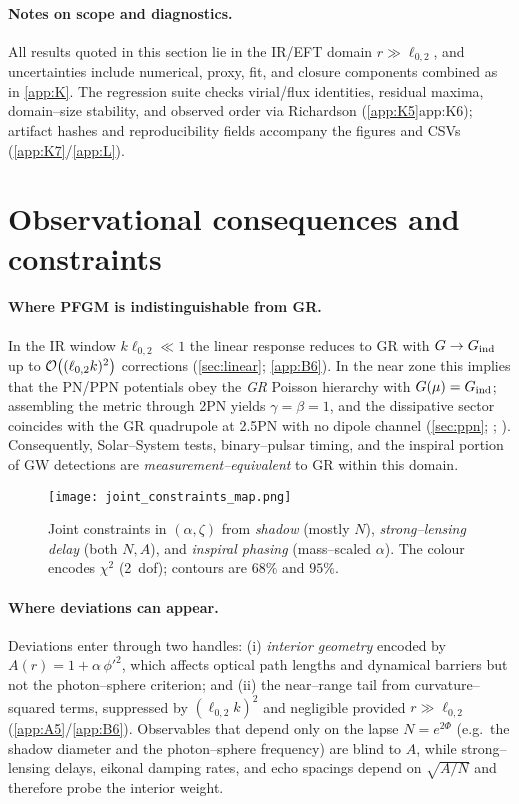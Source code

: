 \documentclass{iopjournal}
\begin{document}
\paragraph{Notes on scope and diagnostics.}
All results quoted in this section lie in the IR/EFT domain \(r\gg\ell_{0,2}\), and uncertainties include numerical, proxy, fit, and closure components combined as in \cref{app:K}. The regression suite checks virial/flux identities, residual maxima, domain–size stability, and observed order via Richardson (\cref{app:K5}{app:K6}); artifact hashes and reproducibility fields accompany the figures and CSVs (\cref{app:K7}/\cref{app:L}).

\section{Observational consequences and constraints}\label{sec:obs}
\paragraph{Where PFGM is indistinguishable from GR.}
In the IR window $k\ell_{0,2}\ll1$ the linear response reduces to GR with $G\to G_{\rm ind}$ up to $\order{(\ell_{0,2}k)^2}$ corrections (\cref{sec:linear}; \cref{app:B6}). In the near zone this implies that the PN/PPN potentials obey the \emph{GR} Poisson hierarchy with $G(\mu)=G_{\rm ind}$; assembling the metric through 2PN yields $\gamma=\beta=1$, and the dissipative sector coincides with the GR quadrupole at 2.5PN with no dipole channel (\cref{sec:ppn}; ; \cite{PoissonWill2014,Will2014LRR,Blanchet2014LRR}). Consequently, Solar–System tests, binary–pulsar timing, and the inspiral portion of GW detections are \emph{measurement–equivalent} to GR within this domain.

\begin{figure}[t]
\centering
\texttt{[image: joint\_constraints\_map.png]}
\caption{Joint constraints in \((\alpha,\zeta)\) from \textit{shadow} (mostly \(N\)), \textit{strong--lensing delay} (both \(N,A\)), and \textit{inspiral phasing} (mass--scaled \(\alpha\)). The colour encodes \(\chi^2\) (2~dof); contours are \(68\%\) and \(95\%\).}
\label{fig:joint-constraints}
\end{figure}


\paragraph{Where deviations can appear.}
Deviations enter through two handles: (i) \emph{interior geometry} encoded by $A(r)=1+\alpha\,\phi'^2$, which affects optical path lengths and dynamical barriers but not the photon–sphere criterion; and (ii) the near–range tail from curvature–squared terms, suppressed by $(\ell_{0,2}k)^2$ and negligible provided $r\gg \ell_{0,2}$ (\cref{app:A5}/\cref{app:B6}). Observables that depend only on the lapse $N=e^{2\Phi}$ (e.g.\ the shadow diameter and the photon–sphere frequency) are blind to $A$, while strong–lensing delays, eikonal damping rates, and echo spacings depend on $\sqrt{A/N}$ and therefore probe the interior weight.
\end{document}
